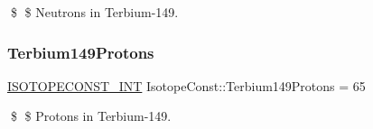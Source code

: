 \$ \$ Neutrons in Terbium-\/149. \mbox{\label{group___isotope_const-_terbium-_tb149_gaa6e3de5e075a929481644d1d418918e1}} 
\subsubsection{\texorpdfstring{Terbium149\+Protons}{Terbium149Protons}}
{\footnotesize\ttfamily \mbox{\hyperlink{group___isotope_const-_macros_ga5f18360b3e99483a35c32d789e62621c}{I\+S\+O\+T\+O\+P\+E\+C\+O\+N\+S\+T\+\_\+\+I\+NT}} Isotope\+Const\+::\+Terbium149\+Protons = 65}

\$ \$ Protons in Terbium-\/149. 